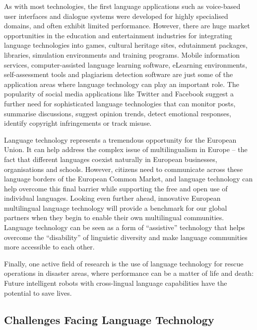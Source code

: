\begin{multicols}{2}
    As with most technologies, the first language applications such as voice-based user interfaces and dialogue systems were developed for highly specialised domains, and often exhibit limited performance. However, there are huge market opportunities in the education and entertainment industries for integrating language technologies into games, cultural heritage sites, edutainment packages, libraries, simulation environments and training programs. Mobile information services, computer-assisted language learning software, eLearning environments, self-assessment tools and plagiarism detection software are just some of the application areas where language technology can play an important role. The popularity of social media applications like Twitter and Facebook suggest a further need for sophisticated language technologies that can monitor posts, summarise discussions, suggest opinion trends, detect emotional responses, identify copyright infringements or track misuse.


    Language technology represents a tremendous opportunity for the European Union. It can help address the complex issue of multilingualism in Europe -- the fact that different languages coexist naturally in European businesses, organisations and schools. However, citizens need to communicate across these language borders of the European Common Market, and language technology can help overcome this final barrier while supporting the free and open use of individual languages. Looking even further ahead, innovative European multilingual language technology will provide a benchmark for our global partners when they begin to enable their own multilingual communities. Language technology can be seen as a form of ``assistive'' technology that helps overcome the ``disability'' of linguistic diversity and make language communities more accessible to each other.

    Finally, one active field of research is the use of language technology for rescue operations in disaster areas, where performance can be a matter of life and death: Future intelligent robots with cross-lingual language capabilities have the potential to save lives.

\subsection{Challenges Facing Language Technology}


\end{multicols}
